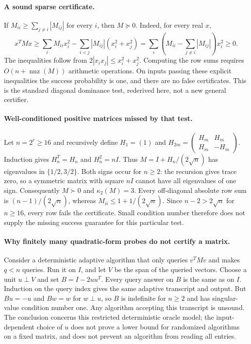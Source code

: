\documentclass[11pt]{article}
\begin{document}
\paragraph{A sound sparse certificate.}
If $M_{ii}\ge\sum_{j\ne i}|M_{ij}|$ for every $i$, then $M\succeq0$.
Indeed, for every real $x$,
\[
x^TMx\ge\sum_i M_{ii}x_i^2-\sum_{i<j}|M_{ij}|(x_i^2+x_j^2)
=\sum_i\left(M_{ii}-\sum_{j\ne i}|M_{ij}|\right)x_i^2\ge0.
\]
The inequalities follow from $2|x_ix_j|\le x_i^2+x_j^2$.
Computing the row sums requires $O(n+\operatorname{nnz}(M))$ arithmetic
operations. On inputs passing these explicit inequalities the success probability
is one, and there are no false certificates. This is the standard diagonal
dominance test, rederived here, not a new general certifier.

\paragraph{Well-conditioned positive matrices missed by that test.}
Let $n=2^r\ge16$ and recursively define $H_1=(1)$ and
$H_{2m}=\left(\begin{smallmatrix}H_m&H_m\\H_m&-H_m\end{smallmatrix}\right)$.
Induction gives $H_n^T=H_n$ and $H_n^2=nI$. Thus
$M=I+H_n/(2\sqrt n)$ has eigenvalues in $\{1/2,3/2\}$.
Both signs occur for $n\ge2$: the recursion gives trace zero, so a symmetric
matrix with square $nI$ cannot have all eigenvalues of one sign. Consequently
$M\succ0$ and $\kappa_2(M)=3$.
Every off-diagonal absolute row sum is $(n-1)/(2\sqrt n)$, whereas
$M_{ii}\le1+1/(2\sqrt n)$. Since $n-2>2\sqrt n$ for $n\ge16$,
every row fails the certificate. Small condition number therefore does not supply
the missing success guarantee for this particular test.

\paragraph{Why finitely many quadratic-form probes do not certify a matrix.}
Consider a deterministic adaptive algorithm that only queries $v^TMv$ and makes
$q<n$ queries. Run it on $I$, and let $V$ be the span of the queried vectors.
Choose a unit $u\perp V$ and set $B=I-2uu^T$. Every query answer on $B$ is
the same as on $I$. Induction on the query index gives the same adaptive
transcript and output. But $Bu=-u$ and $Bw=w$ for $w\perp u$, so $B$ is
indefinite for $n\ge2$ and has singular-value condition number one.
Any algorithm accepting this transcript is unsound. The conclusion concerns
this restricted deterministic oracle model; the input-dependent choice of $u$
does not prove a lower bound for randomized algorithms on a fixed matrix, and
does not prevent an algorithm from reading all entries.
\end{document}
